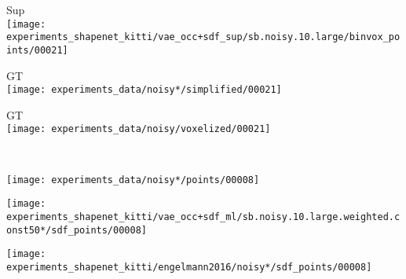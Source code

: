 \begin{minipage}[t]{0.1\textwidth}
    \vspace{0px}
    \centering
    \small Sup\\
    \texttt{[image: experiments\_shapenet\_kitti/vae\_occ+sdf\_sup/sb.noisy.10.large/binvox\_points/00021]}
\end{minipage}
\begin{minipage}[t]{0.1\textwidth}
    \vspace{0px}
    \centering
    \small GT\\
    \texttt{[image: experiments\_data/noisy*/simplified/00021]}
\end{minipage}
\begin{minipage}[t]{0.1\textwidth}
    \vspace{0px}
    \centering
    \small GT\\
    \texttt{[image: experiments\_data/noisy/voxelized/00021]}
\end{minipage}\\
\begin{minipage}[t]{0.02\textwidth}
    \vspace{0px}
\end{minipage}
\begin{minipage}[t]{0.1\textwidth}
    \vspace{0px}
    \centering
    \texttt{[image: experiments\_data/noisy*/points/00008]}
\end{minipage}
\begin{minipage}[t]{0.1\textwidth}
    \vspace{0px}
    \centering
    \texttt{[image: experiments\_shapenet\_kitti/vae\_occ+sdf\_ml/sb.noisy.10.large.weighted.const50*/sdf\_points/00008]}
\end{minipage}
\begin{minipage}[t]{0.1\textwidth}
    \vspace{0px}
    \centering
    \texttt{[image: experiments\_shapenet\_kitti/engelmann2016/noisy*/sdf\_points/00008]}
\end{minipage}
